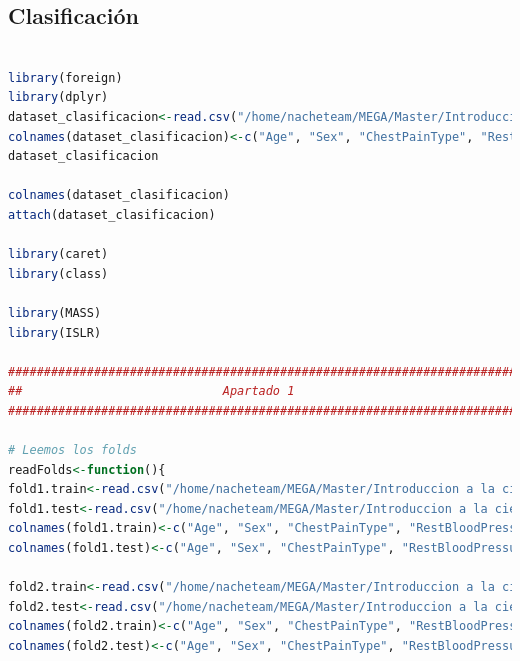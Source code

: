 \documentclass[12pt,a4paper]{article}
\begin{document}
\subsection{Clasificación}

\begin{lstlisting}[basicstyle=\tiny, language=R]

library(foreign)
library(dplyr)
dataset_clasificacion<-read.csv("/home/nacheteam/MEGA/Master/Introduccion a la ciencia de datos/Trabajo Integrador/DATOS/Datasets Clasificacion/heart/heart.dat", header=FALSE, comment.char = "@")
colnames(dataset_clasificacion)<-c("Age", "Sex", "ChestPainType", "RestBloodPressure", "SerumCholestoral", "FastingBloodSugar", "ResElectrocardiographic", "MaxHeartRate", "ExerciseInduced", "Oldpeak", "Slope", "MajorVessels", "Thal", "Class")
dataset_clasificacion

colnames(dataset_clasificacion)
attach(dataset_clasificacion)

library(caret)
library(class)

library(MASS)
library(ISLR)

###########################################################################
##                            Apartado 1                                 ##
###########################################################################

# Leemos los folds
readFolds<-function(){
fold1.train<-read.csv("/home/nacheteam/MEGA/Master/Introduccion a la ciencia de datos/Trabajo Integrador/DATOS/Datasets Clasificacion/heart/heart-10-1tra.dat", header=FALSE, comment.char = "@")
fold1.test<-read.csv("/home/nacheteam/MEGA/Master/Introduccion a la ciencia de datos/Trabajo Integrador/DATOS/Datasets Clasificacion/heart/heart-10-1tst.dat", header=FALSE, comment.char = "@")
colnames(fold1.train)<-c("Age", "Sex", "ChestPainType", "RestBloodPressure", "SerumCholestoral", "FastingBloodSugar", "ResElectrocardiographic", "MaxHeartRate", "ExerciseInduced", "Oldpeak", "Slope", "MajorVessels", "Thal", "Class")
colnames(fold1.test)<-c("Age", "Sex", "ChestPainType", "RestBloodPressure", "SerumCholestoral", "FastingBloodSugar", "ResElectrocardiographic", "MaxHeartRate", "ExerciseInduced", "Oldpeak", "Slope", "MajorVessels", "Thal", "Class")

fold2.train<-read.csv("/home/nacheteam/MEGA/Master/Introduccion a la ciencia de datos/Trabajo Integrador/DATOS/Datasets Clasificacion/heart/heart-10-2tra.dat", header=FALSE, comment.char = "@")
fold2.test<-read.csv("/home/nacheteam/MEGA/Master/Introduccion a la ciencia de datos/Trabajo Integrador/DATOS/Datasets Clasificacion/heart/heart-10-2tst.dat", header=FALSE, comment.char = "@")
colnames(fold2.train)<-c("Age", "Sex", "ChestPainType", "RestBloodPressure", "SerumCholestoral", "FastingBloodSugar", "ResElectrocardiographic", "MaxHeartRate", "ExerciseInduced", "Oldpeak", "Slope", "MajorVessels", "Thal", "Class")
colnames(fold2.test)<-c("Age", "Sex", "ChestPainType", "RestBloodPressure", "SerumCholestoral", "FastingBloodSugar", "ResElectrocardiographic", "MaxHeartRate", "ExerciseInduced", "Oldpeak", "Slope", "MajorVessels", "Thal", "Class")


\end{lstlisting}
\end{document}
